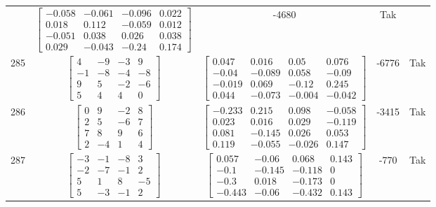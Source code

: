 \documentclass[a4paper,12pt]{article}
\begin{document}
\begin{tabular}{c c c c c}
&
$\begin{bmatrix} -0.058 & -0.061 & -0.096 & 0.022 \\ 0.018 & 0.112 & -0.059 & 0.012 \\ -0.051 & 0.038 & 0.026 & 0.038 \\ 0.029 & -0.043 & -0.24 & 0.174 \end{bmatrix}$
&
-4680
&
Tak
\\
285
&
$\begin{bmatrix} 4 & -9 & -3 & 9 \\ -1 & -8 & -4 & -8 \\ 9 & 5 & -2 & -6 \\ 5 & 4 & 4 & 0 \end{bmatrix}$
&
$\begin{bmatrix} 0.047 & 0.016 & 0.05 & 0.076 \\ -0.04 & -0.089 & 0.058 & -0.09 \\ -0.019 & 0.069 & -0.12 & 0.245 \\ 0.044 & -0.073 & -0.004 & -0.042 \end{bmatrix}$
&
-6776
&
Tak
\\
286
&
$\begin{bmatrix} 0 & 9 & -2 & 8 \\ 2 & 5 & -6 & 7 \\ 7 & 8 & 9 & 6 \\ 2 & -4 & 1 & 4 \end{bmatrix}$
&
$\begin{bmatrix} -0.233 & 0.215 & 0.098 & -0.058 \\ 0.023 & 0.016 & 0.029 & -0.119 \\ 0.081 & -0.145 & 0.026 & 0.053 \\ 0.119 & -0.055 & -0.026 & 0.147 \end{bmatrix}$
&
-3415
&
Tak
\\
287
&
$\begin{bmatrix} -3 & -1 & -8 & 3 \\ -2 & -7 & -1 & 2 \\ 5 & 1 & 8 & -5 \\ 5 & -3 & -1 & 2 \end{bmatrix}$
&
$\begin{bmatrix} 0.057 & -0.06 & 0.068 & 0.143 \\ -0.1 & -0.145 & -0.118 & 0 \\ -0.3 & 0.018 & -0.173 & 0 \\ -0.443 & -0.06 & -0.432 & 0.143 \end{bmatrix}$
&
-770
&
Tak
\\

\end{tabular}
\end{document}
